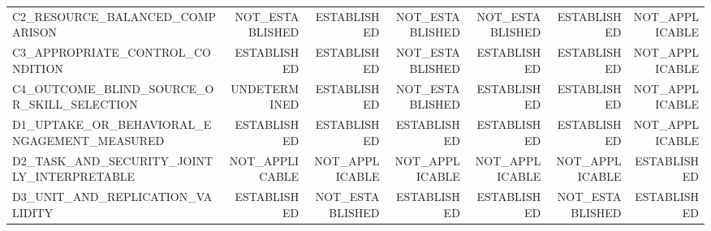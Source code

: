 \begin{table}[t]
{\begin{tabular}{@{}lrrrrrr@{}}
C2\_RESOURCE\_BALANCED\_COMPARISON & NOT\_ESTABLISHED & ESTABLISHED & NOT\_ESTABLISHED & NOT\_ESTABLISHED & ESTABLISHED & NOT\_APPLICABLE \\
C3\_APPROPRIATE\_CONTROL\_CONDITION & ESTABLISHED & ESTABLISHED & NOT\_ESTABLISHED & ESTABLISHED & ESTABLISHED & NOT\_APPLICABLE \\
C4\_OUTCOME\_BLIND\_SOURCE\_OR\_SKILL\_SELECTION & UNDETERMINED & ESTABLISHED & NOT\_ESTABLISHED & ESTABLISHED & ESTABLISHED & NOT\_APPLICABLE \\
D1\_UPTAKE\_OR\_BEHAVIORAL\_ENGAGEMENT\_MEASURED & ESTABLISHED & ESTABLISHED & ESTABLISHED & ESTABLISHED & ESTABLISHED & NOT\_APPLICABLE \\
D2\_TASK\_AND\_SECURITY\_JOINTLY\_INTERPRETABLE & NOT\_APPLICABLE & NOT\_APPLICABLE & NOT\_APPLICABLE & NOT\_APPLICABLE & NOT\_APPLICABLE & ESTABLISHED \\
D3\_UNIT\_AND\_REPLICATION\_VALIDITY & ESTABLISHED & NOT\_ESTABLISHED & ESTABLISHED & ESTABLISHED & NOT\_ESTABLISHED & ESTABLISHED \\
\bottomrule
\end{tabular}%
}
\end{table}
